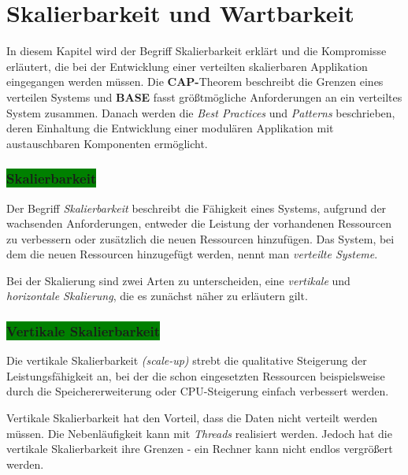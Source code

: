 \chapter{Skalierbarkeit und Wartbarkeit}

In diesem Kapitel wird der Begriff Skalierbarkeit erklärt und die Kompromisse erläutert, die bei der Entwicklung einer verteilten skalierbaren Applikation eingegangen werden müssen. Die \textbf{CAP-}Theorem beschreibt die Grenzen eines verteilen Systems und \textbf{BASE} fasst größtmögliche Anforderungen an ein verteiltes System zusammen. Danach werden die \textit{Best Practices} und \textit{Patterns} beschrieben, deren Einhaltung die Entwicklung einer modulären Applikation mit austauschbaren Komponenten ermöglicht. 

\subsection{\colorbox{green}{Skalierbarkeit}}\label{scale}

Der Begriff \textit{Skalierbarkeit} beschreibt die Fähigkeit eines Systems,  aufgrund der wachsenden Anforderungen, entweder die Leistung der vorhandenen Ressourcen zu verbessern oder zusätzlich die neuen Ressourcen hinzufügen. Das System, bei dem die neuen Ressourcen hinzugefügt werden, nennt man \textit{verteilte Systeme}.

Bei der Skalierung sind zwei Arten zu unterscheiden, eine \textit{vertikale} und \textit{horizontale Skalierung}, die es zunächst näher zu erläutern gilt.

\subsection{\colorbox{green}{Vertikale Skalierbarkeit}}

Die vertikale Skalierbarkeit \textit{(scale-up)} strebt die qualitative Steigerung der Leistungsfähigkeit an, bei der die schon eingesetzten Ressourcen beispielsweise durch die Speichererweiterung oder CPU-Steigerung einfach verbessert werden.

Vertikale Skalierbarkeit hat den Vorteil, dass die Daten nicht verteilt werden müssen. Die Nebenläufigkeit kann mit \textit{Threads} realisiert werden. Jedoch hat die vertikale Skalierbarkeit ihre Grenzen - ein Rechner kann nicht endlos vergrößert werden. 

